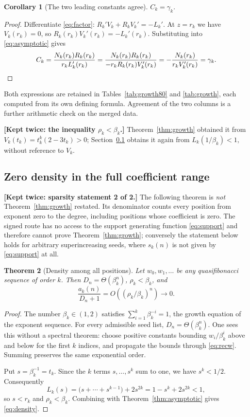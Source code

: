 \documentclass[11pt,letterpaper]{article}
\numberwithin{equation}{section}
\newtheorem{theorem}{Theorem}[section]
\newtheorem{corollary}[theorem]{Corollary}
\theoremstyle{definition}
\theoremstyle{remark}
\begin{document}
\begin{corollary}[The two leading constants agree]
\label{cor:constants}
$C_k=\gamma_k$.
\end{corollary}
\begin{proof}
Differentiate \eqref{eq:factor}: $R_k'V_k+R_kV_k'=-L_k'$. At $z=r_k$ we
have $V_k(r_k)=0$, so $R_k(r_k)V_k'(r_k)=-L_k'(r_k)$. Substituting into
\eqref{eq:asymptotic} gives
\[
 C_k=\frac{N_k(r_k)R_k(r_k)}{r_kL_k'(r_k)}
   =\frac{N_k(r_k)R_k(r_k)}{-r_kR_k(r_k)V_k'(r_k)}
   =-\frac{N_k(r_k)}{r_kV_k'(r_k)}=\gamma_k .\qedhere
\]
\end{proof}

Both expressions are retained in Tables~\ref{tab:growth80} and
\ref{tab:growth}, each computed from its own defining formula. Agreement of
the two columns is a further arithmetic check on the merged data.

\noindent\textbf{[Kept twice: the inequality $\rho_k<\beta_k$.]}
Theorem~\ref{thm:growth} obtained it from $V_k(t_k)=t_k^k(2-3t_k)>0$;
Section~\ref{sec:densityall} obtains it again from $L_k(1/\beta_k)<1$,
without reference to $V_k$.

\subsection{Zero density in the full coefficient range}
\label{sec:densityall}

\noindent\textbf{[Kept twice: sparsity statement 2 of 2.]}
The following theorem is \emph{not} Theorem~\ref{thm:growth} restated. Its
denominator counts every position from exponent zero to the degree,
including positions whose coefficient is zero. The signed route has no
access to the support generating function \eqref{eq:support} and therefore
cannot prove Theorem~\ref{thm:growth}; conversely the statement below holds
for arbitrary superincreasing seeds, where $s_k(n)$ is not given by
\eqref{eq:support} at all.

\begin{theorem}[Density among all positions]
\label{thm:densityall}
Let $w_0,w_1,\ldots$ be any quasifibonacci sequence of order $k$. Then
$D_n=\Theta(\beta_k^n)$, $\rho_k<\beta_k$, and
\begin{equation}
 \frac{a_k(n)}{D_n+1}=O\!\left((\rho_k/\beta_k)^n\right)\longrightarrow0 .
 \label{eq:density}
\end{equation}
\end{theorem}
\begin{proof}
The number $\beta_k\in(1,2)$ satisfies $\sum_{i=1}^k\beta_k^{-i}=1$, the
growth equation of the exponent sequence. For every admissible seed list,
$D_n=\Theta(\beta_k^n)$. One sees this without a spectral theorem: choose
positive constants bounding $w_i/\beta_k^i$ above and below for the first
$k$ indices, and propagate the bounds through \eqref{eq:recw}. Summing
preserves the same exponential order.

Put $s=\beta_k^{-1}=t_k$. Since the $k$ terms $s,\ldots,s^k$ sum to one, we
have $s^k<1/2$. Consequently
\[
 L_k(s)=\bigl(s+\cdots+s^{k-1}\bigr)+2s^{2k}=1-s^k+2s^{2k}<1,
\]
so $s<r_k$ and $\rho_k<\beta_k$. Combining with
Theorem~\ref{thm:asymptotic} gives \eqref{eq:density}.
\end{proof}
\end{document}
